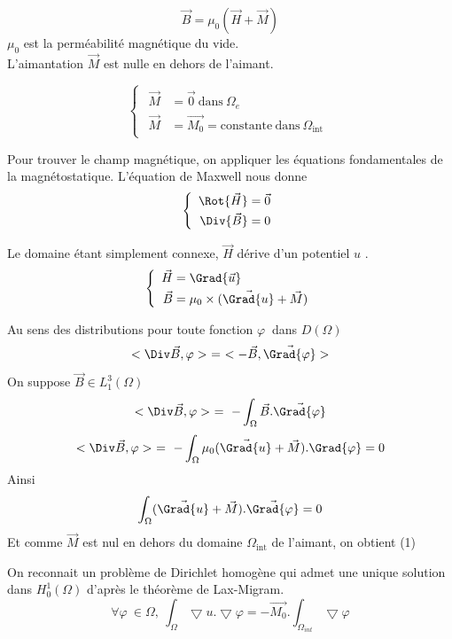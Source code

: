 \documentclass[a4paper,12pt,titlepage]{report}
\begin{document}
\begin{onehalfspace}
\[\vec{B}=\mu _{0}(\vec{H}+\vec{M})\]
$\mu _{0}$ est la perméabilité magnétique du vide. \\
L'aimantation $\vec{M}$ est nulle en dehors de l'aimant.
 
\[ 
\left\{
\begin{array}{ccc}
\begin{aligned}
	\vec{M} &= \vec{0} \  \text{dans} \ \Omega_{e} \\ 
	\vec{M} &= \vec{M_{0}} = \text{constante}  \ \text{dans}  \  \Omega_{\text{int}}
\end{aligned}
\end{array}
\right.
\]

Pour trouver le champ magnétique, on appliquer les équations fondamentales de la magnétostatique. L'équation de Maxwell nous donne 
\[
	\left\{
	\begin{array}{ccc}
	\begin{aligned}
		\Rot{\vec{H}} &= \vec {0} \\
		\Div{\vec{B}} &= 0
	\end{aligned}
	\end{array}
	\right.
\]

Le domaine étant simplement connexe, $\vec{H}$ dérive d'un potentiel $u$	.
\[
	\left\{
	\begin{array}{ccc}		
	\begin{aligned}
		\vec{H} &= \Grad{\vec{u}} \\
		\vec{B} &= \mu_{0}\times(\vec{\Grad{u}}+\vec{M})
	\end{aligned}
	\end{array}
	\right.
\]

Au sens des distributions pour toute fonction $\varphi\ $  dans $D(\Omega)$	
\[<\Div\vec{B},\varphi> \ = \ <-\vec{B},\vec{\Grad{\varphi}}>\]
On suppose $\vec{B} \in L^{3}_{1}(\Omega)$
\[<\Div\vec{B},\varphi> \ = \  -\int_{\Omega}\vec{B}. \vec{\Grad{\varphi}}\]
\[<\Div\vec{B},\varphi> \ = \ -\int_{\Omega}\mu_{0}(\vec{\Grad{u}}+\vec{M}) .{\Grad{\varphi}} = 0\]
Ainsi
\[\int_{\Omega}(\vec{\Grad{u}}+\vec{M}) . \vec{\Grad{\varphi}} = 0\]
Et comme $\vec{M}$ est nul en dehors du domaine $\Omega_{\text{int}}$ de l'aimant, on obtient (1)

On reconnait un problème de Dirichlet homogène qui admet une unique solution dans $H_{0}^{1}(\Omega)$ d'après le théorème de Lax-Migram.
\begin{equation}
\label{E}
\forall \varphi\ \in \Omega, \ \int_{\Omega}\bigtriangledown u .\bigtriangledown{\varphi} = -\vec{M_{0}}. \int_{\Omega_{int}}\bigtriangledown\varphi
\end{equation}


\end{onehalfspace}
\end{document}
